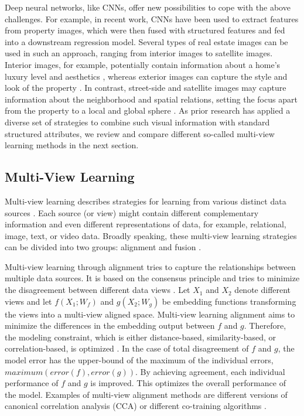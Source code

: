 \documentclass[letterpaper]{article}
\begin{document}
Deep neural networks, like CNNs, offer new possibilities to cope with the above challenges. For example, in recent work, CNNs have been used to extract features from property images, which were then fused with structured features and fed into a downstream regression model. Several types of real estate images can be used in such an approach, ranging from interior images to satellite images. Interior images, for example, potentially contain information about a home's luxury level and aesthetics \cite{poursaeed2018vision, naumzik2020one}, whereas exterior images can capture the style and look of the property \cite{bessinger2016quantifying}. In contrast, street-side and satellite images may capture information about the neighborhood and spatial relations, setting the focus apart from the property to a local and global sphere \cite{law2019take, bency2017beyond, kucklick2020location}. As prior research has applied a diverse set of strategies to combine such visual information with standard structured attributes, we review and compare different so-called multi-view learning methods in the next section.

\subsection{Multi-View Learning}
Multi-view learning describes strategies for learning from various distinct data sources \cite{sun2013survey}. Each source (or view) might contain different complementary information and even different representations of data, for example, relational, image, text, or video data.
Broadly speaking, these multi-view learning strategies can be divided into two groups: alignment and fusion \cite{li2018survey}.

Multi-view learning through alignment tries to capture the relationships between multiple data sources. It is based on the consensus principle and tries to minimize the disagreement between different data views \cite{xu2013survey}. Let $X_1$ and $X_2$ denote different views and let $f(X_1; W_f)$ and $g(X_2; W_g)$ be embedding functions transforming the views into a multi-view aligned space. Multi-view learning alignment aims to minimize the differences in the embedding output between $f$ and $g$. Therefore, the modeling constraint, which is either distance-based, similarity-based, or correlation-based, is optimized \cite{li2018survey}. In the case of total disagreement of $f$ and $g$, the model error has the upper-bound of the maximum of the individual errors, $maximum(error(f), error(g))$. By achieving agreement, each individual performance of $f$ and $g$ is improved. This optimizes the overall performance of the model. Examples of multi-view alignment methods are different versions of canonical correlation analysis (CCA) \cite{li2018survey} or different co-training algorithms \cite{zhao2017multi}.
\end{document}
